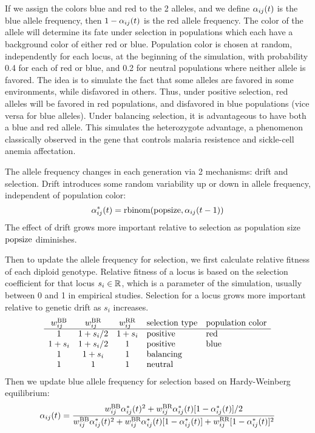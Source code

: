 \documentclass[a4paper,12pt]{article}
\begin{document}

If we assign the colors blue and red to the 2 alleles, and we define
$\alpha_{ij}(t)$ is the blue allele frequency, then $1-\alpha_{ij}(t)$ is the red allele
frequency. The color of the allele will determine its fate under
selection in populations which each have a background color of either
red or blue. Population color is chosen at random, independently for
each locus, at the beginning of the simulation, with probability 0.4
for each of red or blue, and 0.2 for neutral populations where neither
allele is favored. The idea is to simulate the fact that some alleles
are favored in some environments, while disfavored in others. Thus,
under positive selection, red alleles will be favored in red
populations, and disfavored in blue populations (vice versa for blue
alleles). Under balancing selection, it is advantageous to have both a
blue and red allele. This simulates the heterozygote advantage, a
phenomenon classically observed in the gene that controls malaria
resistence and sickle-cell anemia affectation.

The allele frequency changes in each generation via
2 mechanisms: drift and selection. Drift introduces some random
variability up or down in allele frequency, independent of population
color:
$$\alpha_{ij}^*(t) = \operatorname{rbinom}(\text{popsize},\alpha_{ij}(t-1))$$
The effect of drift grows more important relative to selection as
population size $\text{popsize}$ diminishes.

Then to update the allele frequency for selection, we first calculate
relative fitness of each diploid genotype. Relative fitness of a locus
is based on the selection coefficient for that locus $s_i\in \mathbb R$,
which is a parameter of the simulation, usually between 0 and 1 in
empirical studies. Selection for a locus grows more important relative
to genetic drift as $s_i$ increases.
$$
\begin{array}{cccll}
w_{ij}^{\text{BB}} & w_{ij}^{\text{BR}} & w_{ij}^{\text{RR}} & \text{selection type} & \text{population color}\\
\hline
1 & 1+s_i/2 & 1+s_i & \text{positive}& \text{red}\\
1+s_i & 1+s_i/2 & 1 & \text{positive}& \text{blue}\\
1 & 1+s_i & 1 & \text{balancing}& \\
1 & 1 & 1 & \text{neutral}& 
\end{array}
$$
Then we update blue allele frequency for selection based on
Hardy-Weinberg equilibrium:
$$\alpha_{ij}(t) = \frac{
w_{ij}^{\text{BB}}\alpha_{ij}^*(t)^2 + w_{ij}^{\text{BR}}\alpha_{ij}^*(t)[1-\alpha_{ij}^*(t)]/2 }{
w_{ij}^{\text{BB}}\alpha_{ij}^*(t)^2 + w_{ij}^{\text{BR}}\alpha_{ij}^*(t)[1-\alpha_{ij}^*(t)] + w_{ij}^{\text{RR}}[1-\alpha_{ij}^*(t)]^2
   }$$
\end{document}
